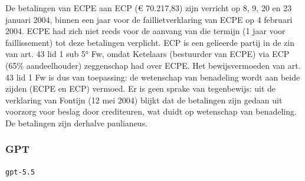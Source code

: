 \documentclass[
  dutch,
  a4paper,
]{article}
\begin{document}
De betalingen van ECPE aan ECP (€ 70.217,83) zijn verricht op 8, 9, 20 en 23 januari 2004, binnen een jaar voor de faillietverklaring van ECPE op 4 februari 2004. ECPE had zich niet reeds voor de aanvang van die termijn (1 jaar voor faillissement) tot deze betalingen verplicht. ECP is een gelieerde partij in de zin van art. 43 lid 1 sub 5° Fw, omdat Ketelaars (bestuurder van ECPE) via ECP (65\% aandeelhouder) zeggenschap had over ECPE. Het bewijsvermoeden van art. 43 lid 1 Fw is dus van toepassing: de wetenschap van benadeling wordt aan beide zijden (ECPE en ECP) vermoed. Er is geen sprake van tegenbewijs: uit de verklaring van Fontijn (12 mei 2004) blijkt dat de betalingen zijn gedaan uit voorzorg voor beslag door crediteuren, wat duidt op wetenschap van benadeling. De betalingen zijn derhalve paulianeus.

\newpage


\subsubsection{GPT}\label{gpt-17}

\texttt{gpt-5.5}
\end{document}
